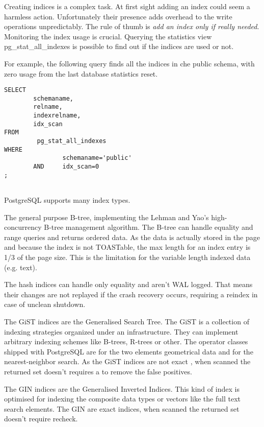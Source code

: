 Creating indices is a complex task. At first sight adding an index could seem a 
harmless action. Unfortunately their presence adds overhead to the write 
operations unpredictably. The rule of thumb is \textit{add an index only 
if really needed}. Monitoring the index usage is crucial. Querying the 
statistics view pg\_stat\_all\_indexes is possible to find out if the indices 
are used or not.

For example, the following query finds all the indices in che public 
schema, with zero usage from the last database statistics reset.

\begin{lstlisting}[style=pgsql]
SELECT
        schemaname,
        relname,
        indexrelname,
        idx_scan
FROM
         pg_stat_all_indexes
WHERE
                schemaname='public'
        AND     idx_scan=0
;


\end{lstlisting}



PostgreSQL supports many index types. 

The general purpose B-tree, implementing the Lehman and 
Yao's high-concurrency B-tree management algorithm. The B-tree can handle 
equality and range queries and returns ordered data. As the data is actually 
stored in the page and because the index is not TOASTable, the max length for an 
index entry is 1/3 of the page size. This is the limitation for the variable 
length indexed data (e.g. text). \newline

The hash indices can handle only equality and aren't WAL 
logged. That means their changes are not replayed if the crash recovery occurs, 
requiring a reindex in case of unclean shutdown.\newline

The GiST indices are the Generalised Search Tree. The GiST 
is a collection of indexing strategies organized under an 
infrastructure. They can implement arbitrary indexing schemes like B-trees, 
R-trees  or other. The operator classes shipped with PostgreSQL are for the two 
elements geometrical data and for the nearest-neighbor search. As the GiST 
indices are not exact , when scanned the returned set doesn't requires a to 
remove the false positives.\newline

The GIN indices  are the Generalised Inverted Indices. This 
kind of index is optimised for indexing the composite data types or vectors 
like the full text search elements. The GIN are exact indices, when scanned the 
returned set doesn't require recheck.


